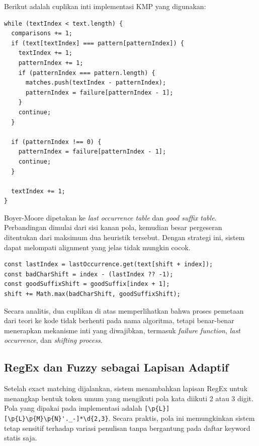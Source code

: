 Berikut adalah cuplikan inti implementasi KMP yang digunakan:

\begin{lstlisting}[language={}, breaklines=true, breakatwhitespace=false, columns=fullflexible, caption={Cuplikan inti KMP pada file src/algorithms/kmp.ts}]
while (textIndex < text.length) {
  comparisons += 1;
  if (text[textIndex] === pattern[patternIndex]) {
    textIndex += 1;
    patternIndex += 1;
    if (patternIndex === pattern.length) {
      matches.push(textIndex - patternIndex);
      patternIndex = failure[patternIndex - 1];
    }
    continue;
  }

  if (patternIndex !== 0) {
    patternIndex = failure[patternIndex - 1];
    continue;
  }

  textIndex += 1;
}
\end{lstlisting}

Boyer-Moore dipetakan ke \textit{last occurrence table} dan \textit{good suffix table}. Perbandingan dimulai dari sisi kanan pola, kemudian besar pergeseran ditentukan dari maksimum dua heuristik tersebut. Dengan strategi ini, sistem dapat melompati alignment yang jelas tidak mungkin cocok.

\begin{lstlisting}[language={}, breaklines=true, breakatwhitespace=false, columns=fullflexible, caption={Cuplikan penentuan pergeseran Boyer-Moore pada file src/algorithms/boyerMoore.ts}]
const lastIndex = lastOccurrence.get(text[shift + index]);
const badCharShift = index - (lastIndex ?? -1);
const goodSuffixShift = goodSuffix[index + 1];
shift += Math.max(badCharShift, goodSuffixShift);
\end{lstlisting}

Secara analitis, dua cuplikan di atas memperlihatkan bahwa proses pemetaan dari teori ke kode tidak berhenti pada nama algoritma, tetapi benar-benar menerapkan mekanisme inti yang diwajibkan, termasuk \textit{failure function}, \textit{last occurrence}, dan \textit{shifting process}.

\subsection{RegEx dan Fuzzy sebagai Lapisan Adaptif}

Setelah exact matching dijalankan, sistem menambahkan lapisan RegEx untuk menangkap bentuk token umum yang mengikuti pola kata diikuti 2 atau 3 digit. Pola yang dipakai pada implementasi adalah \verb|[\p{L}][\p{L}\p{M}\p{N}'._-]*\d{2,3}|. Secara praktis, pola ini memungkinkan sistem tetap sensitif terhadap variasi penulisan tanpa bergantung pada daftar keyword statis saja.

